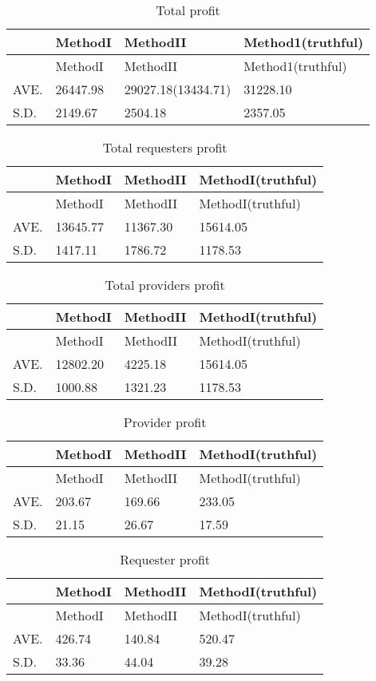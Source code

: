 \hypertarget{tbl:total-profit-case2}{}
\begin{longtable}[H]{@{}llll@{}}
\caption{\label{tbl:total-profit-case2}Total profit}\tabularnewline
\toprule
& MethodI & MethodII & Method1(truthful)\tabularnewline
\midrule
\endfirsthead
\toprule
& MethodI & MethodII & Method1(truthful)\tabularnewline
\midrule
\endhead
AVE. & 26447.98 & 29027.18(13434.71) & 31228.10\tabularnewline
S.D. & 2149.67 & 2504.18 & 2357.05\tabularnewline
\bottomrule
\end{longtable}

\hypertarget{tbl:total-profit-case2}{}
\begin{longtable}[H]{@{}llll@{}}
\caption{\label{tbl:total-profit-case2}Total requesters
profit}\tabularnewline
\toprule
& MethodI & MethodII & MethodI(truthful)\tabularnewline
\midrule
\endfirsthead
\toprule
& MethodI & MethodII & MethodI(truthful)\tabularnewline
\midrule
\endhead
AVE. & 13645.77 & 11367.30 & 15614.05\tabularnewline
S.D. & 1417.11 & 1786.72 & 1178.53\tabularnewline
\bottomrule
\end{longtable}

\hypertarget{tbl:total-providers-profit-case2}{}
\begin{longtable}[H]{@{}llll@{}}
\caption{\label{tbl:total-providers-profit-case2}Total providers
profit}\tabularnewline
\toprule
& MethodI & MethodII & MethodI(truthful)\tabularnewline
\midrule
\endfirsthead
\toprule
& MethodI & MethodII & MethodI(truthful)\tabularnewline
\midrule
\endhead
AVE. & 12802.20 & 4225.18 & 15614.05\tabularnewline
S.D. & 1000.88 & 1321.23 & 1178.53\tabularnewline
\bottomrule
\end{longtable}

\hypertarget{tbl:total-requesters-profit-case2}{}
\begin{longtable}[H]{@{}llll@{}}
\caption{\label{tbl:total-requesters-profit-case2}Provider
profit}\tabularnewline
\toprule
& MethodI & MethodII & MethodI(truthful)\tabularnewline
\midrule
\endfirsthead
\toprule
& MethodI & MethodII & MethodI(truthful)\tabularnewline
\midrule
\endhead
AVE. & 203.67 & 169.66 & 233.05\tabularnewline
S.D. & 21.15 & 26.67 & 17.59\tabularnewline
\bottomrule
\end{longtable}

\hypertarget{tbl:requester-profit-case2}{}
\begin{longtable}[H]{@{}llll@{}}
\caption{\label{tbl:requester-profit-case2}Requester
profit}\tabularnewline
\toprule
& MethodI & MethodII & MethodI(truthful)\tabularnewline
\midrule
\endfirsthead
\toprule
& MethodI & MethodII & MethodI(truthful)\tabularnewline
\midrule
\endhead
AVE. & 426.74 & 140.84 & 520.47\tabularnewline
S.D. & 33.36 & 44.04 & 39.28\tabularnewline
\bottomrule
\end{longtable}

